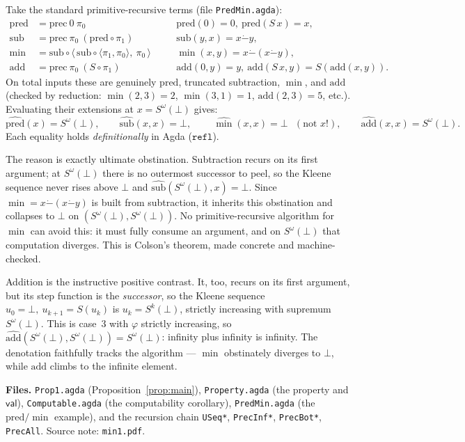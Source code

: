 \documentclass[11pt]{article}
\newcommand{\uoValue}{\mathsf{val}}
\newcommand{\Sw}{S^{\omega}(\bot)}
\newcommand{\dotminus}{\mathbin{\dot{-}}}
\begin{document}
Take the standard primitive-recursive terms (file \texttt{PredMin.agda}):
\[
\begin{aligned}
  \mathrm{pred} &= \mathrm{prec}\ 0\ \pi_0
     &&\quad \mathrm{pred}(0)=0,\ \mathrm{pred}(S\,x)=x,\\
  \mathrm{sub} &= \mathrm{prec}\ \pi_0\ (\mathrm{pred}\circ\pi_1)
     &&\quad \mathrm{sub}(y,x)=x\dotminus y,\\
  \min &= \mathrm{sub}\circ\langle\, \mathrm{sub}\circ\langle\pi_1,\pi_0\rangle,\ \pi_0\,\rangle
     &&\quad \min(x,y)=x\dotminus(x\dotminus y),\\
  \mathrm{add} &= \mathrm{prec}\ \pi_0\ (S\circ\pi_1)
     &&\quad \mathrm{add}(0,y)=y,\ \mathrm{add}(S\,x,y)=S(\mathrm{add}(x,y)).
\end{aligned}
\]
On total inputs these are genuinely $\mathrm{pred}$, truncated subtraction,
$\min$, and $\mathrm{add}$ (checked by reduction: $\min(2,3)=2$, $\min(3,1)=1$,
$\mathrm{add}(2,3)=5$, etc.). Evaluating their extensions at $x=\Sw$ gives:
\[
  \widehat{\mathrm{pred}}(x)=\Sw,\qquad
  \widehat{\mathrm{sub}}(x,x)=\bot,\qquad
  \boxed{\ \widehat{\min}(x,x)=\bot\ }\ \ (\text{not }x!),\qquad
  \widehat{\mathrm{add}}(x,x)=\Sw.
\]
Each equality holds \emph{definitionally} in Agda ($\mathtt{refl}$).

The reason is exactly ultimate obstination. Subtraction recurs on its first
argument; at $\Sw$ there is no outermost successor to peel, so the Kleene
sequence never rises above $\bot$ and $\widehat{\mathrm{sub}}(\Sw,x)=\bot$.
Since $\min=x\dotminus(x\dotminus y)$ is built from subtraction, it inherits
this obstination and collapses to $\bot$ on $(\Sw,\Sw)$. No primitive-recursive
algorithm for $\min$ can avoid this: it must fully consume an argument, and on
$\Sw$ that computation diverges. This is Colson's theorem, made concrete and
machine-checked.

Addition is the instructive positive contrast. It, too, recurs on its first
argument, but its step function is the \emph{successor}, so the Kleene sequence
$u_0=\bot,\ u_{k+1}=S(u_k)$ is $u_k=S^k(\bot)$, strictly increasing with
supremum $\Sw$. This is case~3 with $\varphi$ strictly increasing, so
$\widehat{\mathrm{add}}(\Sw,\Sw)=\Sw$: infinity plus infinity is infinity. The
denotation faithfully tracks the algorithm --- $\min$ obstinately diverges to
$\bot$, while $\mathrm{add}$ climbs to the infinite element.

\bigskip
\noindent\textbf{Files.}
\texttt{Prop1.agda} (Proposition~\ref{prop:main}),
\texttt{Property.agda} (the property and $\uoValue$),
\texttt{Computable.agda} (the computability corollary),
\texttt{PredMin.agda} (the $\mathrm{pred}/\min$ example),
and the recursion chain \texttt{USeq*}, \texttt{PrecInf*}, \texttt{PrecBot*},
\texttt{PrecAll}. Source note: \texttt{min1.pdf}.
\end{document}
